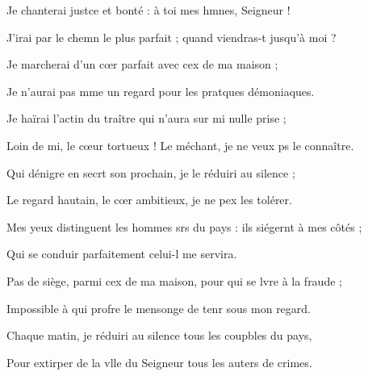 \item Je chanterai justce et bonté :\psstar{} à toi mes hmnes, Seigneur !
\item J’irai par le chemn le plus parfait ;\psstar{} quand viendras-t jusqu’à moi ? 
\item Je marcherai d’un cœr parfait\psstar{} avec cex de ma maison ;
\item Je n’aurai pas mme un regard\psstar{} pour les pratques démoniaques. 
\item Je haïrai l’actin du traître\psstar{} qui n’aura sur mi nulle prise ;
\item Loin de mi, le cœur tortueux !\psstar{} Le méchant, je ne veux ps le connaître.
\item Qui dénigre en secrt son prochain,\psstar{} je le réduiri au silence ;
\item Le regard hautain, le cœr ambitieux,\psstar{} je ne pex les tolérer.
\item Mes yeux distinguent les hommes srs du pays :\psstar{} ils siégernt à mes côtés ;
\item Qui se conduir parfaitement\psstar{} celui-l me servira.
\item Pas de siège, parmi cex de ma maison,\psstar{} pour qui se lvre à la fraude ;
\item Impossible à qui profre le mensonge\psstar{} de tenr sous mon regard.
\item Chaque matin, je réduiri au silence\psstar{} tous les coupbles du pays,
\item Pour extirper de la vlle du Seigneur\psstar{} tous les auters de crimes.